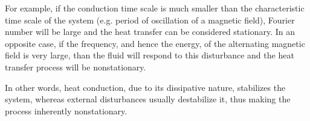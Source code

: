 For example, if the conduction time scale is much smaller than the characteristic time scale of the system (e.g. period of oscillation of a magnetic field), Fourier number will be large and the heat transfer can be considered stationary. In an opposite case, if the frequency, and hence the energy, of the alternating magnetic field is very large, than the fluid will respond to this disturbance and the heat transfer process will be nonstationary.

In other words, heat conduction, due to its dissipative nature, stabilizes the system, whereas external disturbances usually destabilize it, thus making the process inherently nonstationary.
